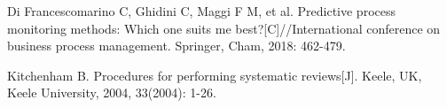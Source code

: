 \documentclass[runningheads]{llncs}
\begin{document}
		
	\newpage
	\begin{thebibliography}{99}
	
	Di Francescomarino C, Ghidini C, Maggi F M, et al. Predictive process monitoring methods: Which one suits me best?[C]//International conference on business process management. Springer, Cham, 2018: 462-479.
	
	Kitchenham B. Procedures for performing systematic reviews[J]. Keele, UK, Keele University, 2004, 33(2004): 1-26.
		
	\end{thebibliography}

	
\end{document}
